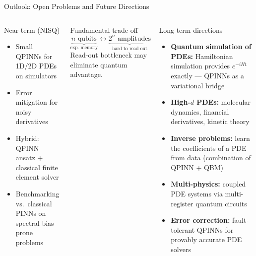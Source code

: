 \documentclass[aspectratio=169,10pt]{beamer}
\begin{document}
\begin{frame}{Outlook: Open Problems and Future Directions}
  \begin{columns}[T]
      \begin{block}{Near-term (NISQ)}
        \begin{itemize}
          \item Small QPINNs for 1D/2D PDEs on simulators
          \item Error mitigation for noisy derivatives
          \item Hybrid: QPINN ansatz + classical finite
                element solver
          \item Benchmarking vs.\ classical PINNs on
                spectral-bias-prone problems
        \end{itemize}
      \end{block}
      \vspace{0.2cm}
      \begin{alertblock}{Fundamental trade-off}
        \[
          \underbrace{n \text{ qubits}}_{\text{exp.\ memory}}
          \longleftrightarrow
          \underbrace{2^n \text{ amplitudes}}_{\text{hard to read out}}
        \]
        Read-out bottleneck may eliminate quantum advantage.
      \end{alertblock}
      \begin{block}{Long-term directions}
        \begin{itemize}
          \item \textbf{Quantum simulation of PDEs:}
                Hamiltonian simulation provides $e^{-iHt}$
                exactly --- QPINNs as a variational bridge
          \item \textbf{High-$d$ PDEs:} molecular dynamics,
                financial derivatives, kinetic theory
          \item \textbf{Inverse problems:} learn the
                coefficients of a PDE from data
                (combination of QPINN + QBM)
          \item \textbf{Multi-physics:}
                coupled PDE systems via multi-register
                quantum circuits
          \item \textbf{Error correction:}
                fault-tolerant QPINNs for provably
                accurate PDE solvers
        \end{itemize}
      \end{block}
  \end{columns}
\end{frame}
\end{document}
